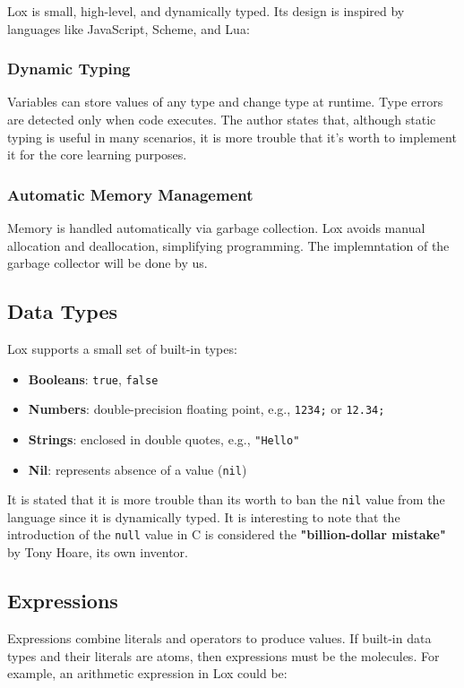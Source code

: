 \documentclass[12pt,a4paper]{article}
\begin{document}
Lox is small, high-level, and dynamically typed. Its design is inspired by languages like JavaScript, Scheme, and Lua:

\subsubsection{Dynamic Typing}
Variables can store values of any type and change type at runtime. Type errors are detected only when code executes.
The author states that, although static typing is useful in many scenarios, it is more trouble that it's worth to implement it
for the core learning purposes.

\subsubsection{Automatic Memory Management}
Memory is handled automatically via garbage collection. Lox avoids manual allocation and deallocation, simplifying programming.
The implemntation of the garbage collector will be done by us.

\subsection{Data Types}

Lox supports a small set of built-in types:

\begin{itemize}
	\item \textbf{Booleans}: \texttt{true}, \texttt{false}
	\item \textbf{Numbers}: double-precision floating point, e.g., \texttt{1234;} or \texttt{12.34;}
	\item \textbf{Strings}: enclosed in double quotes, e.g., \texttt{"Hello"}
	\item \textbf{Nil}: represents absence of a value (\texttt{nil})
\end{itemize}

It is stated that it is more trouble than its worth to ban the \texttt{nil} value from the language since it is dynamically typed. It is interesting to note that
the introduction of the \texttt{null} value in C is considered the \textbf{"billion-dollar mistake"} by Tony Hoare, its own inventor.

\subsection{Expressions}

Expressions combine literals and operators to produce values.
If built-in data types and their literals are atoms, then expressions must be the molecules.
For example, an arithmetic expression in Lox could be:
\end{document}
